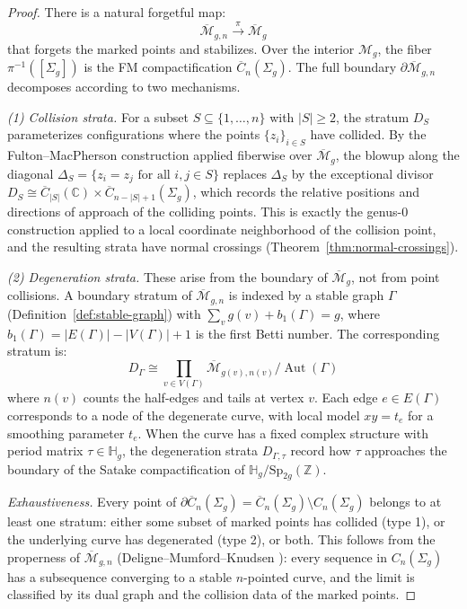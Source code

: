 \begin{proof}
There is a natural forgetful map:
\[
\overline{\mathcal{M}}_{g,n} \xrightarrow{\;\pi\;} \overline{\mathcal{M}}_g
\]
that forgets the marked points and stabilizes.  Over the interior $\mathcal{M}_g$, the fiber $\pi^{-1}([\Sigma_g])$ is the FM compactification $\overline{C}_n(\Sigma_g)$.  The full boundary $\partial\overline{\mathcal{M}}_{g,n}$ decomposes according to two mechanisms.

\emph{(1) Collision strata.}
For a subset $S \subseteq \{1, \ldots, n\}$ with $|S| \geq 2$, the stratum $D_S$ parameterizes configurations where the points $\{z_i\}_{i \in S}$ have collided.  By the Fulton--MacPherson construction applied fiberwise over $\overline{\mathcal{M}}_g$, the blowup along the diagonal $\Delta_S = \{z_i = z_j \text{ for all } i, j \in S\}$ replaces $\Delta_S$ by the exceptional divisor $D_S \cong \overline{C}_{|S|}(\mathbb{C}) \times \overline{C}_{n-|S|+1}(\Sigma_g)$, which records the relative positions and directions of approach of the colliding points.  This is exactly the genus-0 construction applied to a local coordinate neighborhood of the collision point, and the resulting strata have normal crossings (Theorem~\ref{thm:normal-crossings}).

\emph{(2) Degeneration strata.}
These arise from the boundary of $\overline{\mathcal{M}}_g$, not from point collisions.  A boundary stratum of $\overline{\mathcal{M}}_{g,n}$ is indexed by a stable graph $\Gamma$ (Definition~\ref{def:stable-graph}) with $\sum_{v} g(v) + b_1(\Gamma) = g$, where $b_1(\Gamma) = |E(\Gamma)| - |V(\Gamma)| + 1$ is the first Betti number.  The corresponding stratum is:
\[
D_\Gamma \cong \prod_{v \in V(\Gamma)} \overline{\mathcal{M}}_{g(v), n(v)} \bigg/ \operatorname{Aut}(\Gamma)
\]
where $n(v)$ counts the half-edges and tails at vertex $v$.  Each edge $e \in E(\Gamma)$ corresponds to a node of the degenerate curve, with local model $xy = t_e$ for a smoothing parameter $t_e$.  When the curve has a fixed complex structure with period matrix $\tau \in \mathbb{H}_g$, the degeneration strata $D_{\Gamma,\tau}$ record how $\tau$ approaches the boundary of the Satake compactification of $\mathbb{H}_g / \mathrm{Sp}_{2g}(\mathbb{Z})$.

\emph{Exhaustiveness.}
Every point of $\partial\overline{C}_n(\Sigma_g) = \overline{C}_n(\Sigma_g) \setminus C_n(\Sigma_g)$ belongs to at least one stratum: either some subset of marked points has collided (type 1), or the underlying curve has degenerated (type 2), or both.  This follows from the properness of $\overline{\mathcal{M}}_{g,n}$ (Deligne--Mumford--Knudsen \cite{DeligneM69,Knudsen83}): every sequence in $C_n(\Sigma_g)$ has a subsequence converging to a stable $n$-pointed curve, and the limit is classified by its dual graph and the collision data of the marked points.
\end{proof}

